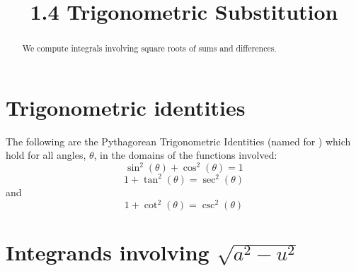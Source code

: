 \documentclass[handout]{ximera}
\title{1.4 Trigonometric Substitution}
\begin{document}
\begin{abstract}
We compute integrals involving square roots of sums and differences.
\end{abstract}

\maketitle

\section{Trigonometric identities}

The following are the Pythagorean Trigonometric Identities 
(named for ) 
which hold for all angles,
$\theta$, in the domains of the functions involved:
\[
\sin^2(\theta) + \cos^2(\theta) = 1
\]
\[
1 + \tan^2(\theta) = \sec^2(\theta)
\]
and
\[
1 + \cot^2(\theta) = \csc^2(\theta)
\]



\section{Integrands involving $\sqrt{a^2 - u^2}$}
\end{document}
